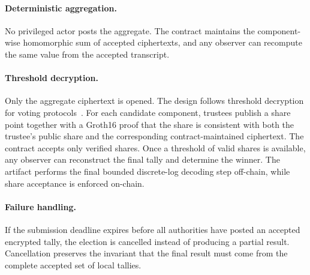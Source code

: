 \paragraph{Deterministic aggregation.}
No privileged actor posts the aggregate. The contract maintains the
component-wise homomorphic sum of accepted ciphertexts, and any observer can
recompute the same value from the accepted transcript.

\paragraph{Threshold decryption.}
Only the aggregate ciphertext is opened. The design follows threshold
decryption for voting protocols~\cite{FC:FouPouSte00}. For each candidate component,
trustees publish a share point together with a Groth16 proof that the share is
consistent with both the trustee's public share and the corresponding
contract-maintained ciphertext. The contract accepts only verified shares.
Once a threshold of valid shares is available, any observer can reconstruct the
final tally and determine the winner. The artifact performs the final bounded
discrete-log decoding step off-chain, while share acceptance is enforced
on-chain.

\paragraph{Failure handling.}
If the submission deadline expires before all authorities have posted an
accepted encrypted tally, the election is cancelled instead of producing a
partial result. Cancellation preserves the invariant that the final result must
come from the complete accepted set of local tallies.
